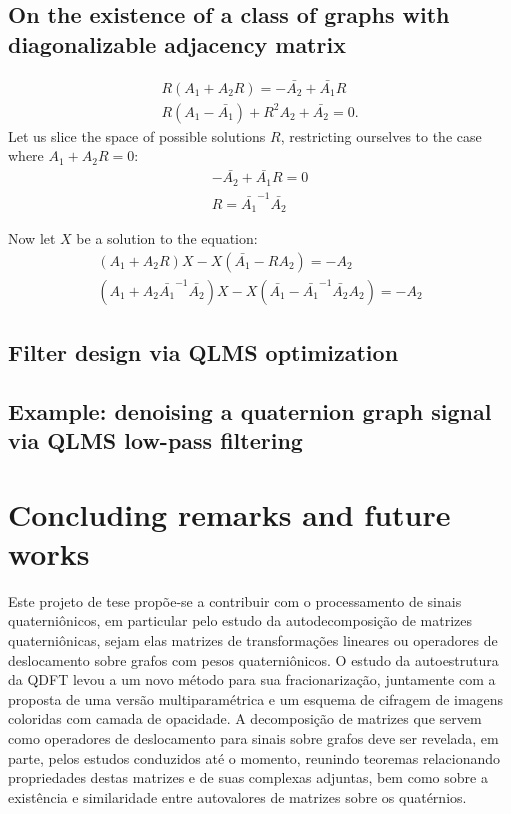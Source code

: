 \section{On the existence of a class of graphs with diagonalizable adjacency matrix}
\begin{equation}
\begin{aligned}
R (A_1 + A_2 R) = - \bar{A_2} + \bar{A_1} R \\
R (A_1 - \bar{A_1}) + R^2 A_2 + \bar{A_2} = 0.
\end{aligned}
\end{equation}
Let us slice the space of possible solutions $R$, restricting ourselves to the case where $A_1 + A_2 R = 0$:
\begin{equation}
\begin{aligned}
- \bar{A_2} + \bar{A_1} R = 0 \\
R = \bar{A_1}^{-1} \bar{A_2}
\end{aligned}
\end{equation}

Now let $X$ be a solution to the equation:
\begin{equation}
\begin{aligned}
(A_1 + A_2 R)X - X(\bar{A_1} - R A_2) = - A_2 \\
(A_1 + A_2 \bar{A_1}^{-1} \bar{A_2})X - X(\bar{A_1} - \bar{A_1}^{-1} \bar{A_2} A_2) = - A_2
\end{aligned}
\end{equation}

\section{Filter design via QLMS optimization}

\section{Example: denoising a quaternion graph signal via QLMS low-pass filtering}

\chapter{Concluding remarks and future works}
\label{ch:conclusion}

Este projeto de tese prop\~oe-se a contribuir com o processamento de sinais quaterni\^onicos, em particular pelo estudo da autodecomposi\c c\~ao de matrizes quaterni\^onicas, sejam elas matrizes de transforma\c c\~oes lineares ou operadores de deslocamento sobre grafos com pesos quaterni\^onicos. O estudo da autoestrutura da QDFT levou a um novo m\'etodo para sua fracionariza\c c\~ao, juntamente com a proposta de uma vers\~ao multiparam\'etrica e um esquema de cifragem de imagens coloridas com camada de opacidade. A decomposi\c c\~ao de matrizes que servem como operadores de deslocamento para sinais sobre grafos deve ser revelada, em parte, pelos estudos conduzidos at\'e o momento, reunindo teoremas relacionando propriedades destas matrizes e de suas complexas adjuntas, bem como sobre a exist\^encia e similaridade entre autovalores de matrizes sobre os quat\'ernios.

